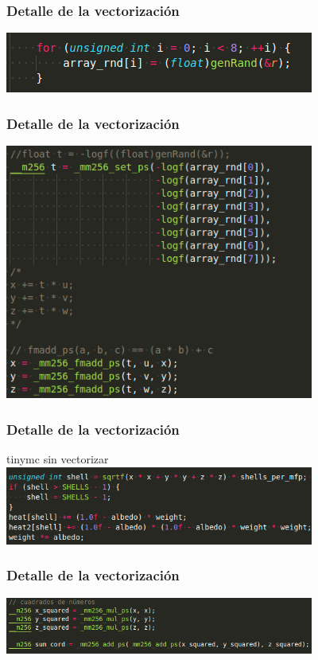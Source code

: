 \documentclass{beamer}
\begin{document}
\begin{frame}
    \frametitle{Detalle de la vectorización}
    \includegraphics[width=4in]{imagenes/detalle_vec3.png}
\end{frame}

\begin{frame}
    \frametitle{Detalle de la vectorización}
    \includegraphics[width=4in]{imagenes/detalle_vec4.png}
\end{frame}

\begin{frame}
    \frametitle{Detalle de la vectorización}
    tinymc sin vectorizar
    \includegraphics[width=4in]{imagenes/comp_tinymc2.png}
\end{frame}

\begin{frame}
    \frametitle{Detalle de la vectorización}
    \includegraphics[width=4in]{imagenes/det_vec5.png}
\end{frame}
\end{document}
